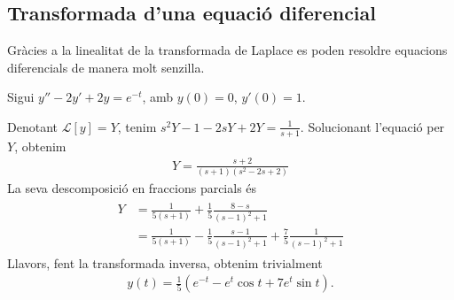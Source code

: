 \subsection{Transformada d'una equació diferencial}
Gràcies a la linealitat de la transformada de Laplace es poden resoldre equacions diferencials de manera molt senzilla.

\begin{example}
    Sigui $y'' -2y' + 2y = e^{-t}$, amb $y(0) = 0$, $y'(0) = 1$.
    
    Denotant $\mathcal{L}[y] = Y$, tenim $\displaystyle s^{2} Y - 1 - 2sY + 2Y = \frac{1}{s+1}$. Solucionant l'equació per $Y$, obtenim
    \begin{align*}
        Y = \frac{s+2}{(s+1)(s^2-2s+2)}
    \end{align*}
    La seva descomposició en fraccions parcials és
    \begin{align*}
    \begin{aligned}
        Y & = \frac{1}{5(s+1)} + \frac{1}{5}\frac{8-s}{(s-1)^{2} + 1} \\
        & = \frac{1}{5(s+1)} - \frac{1}{5}\frac{s-1}{(s-1)^{2} + 1} + \frac{7}{5}\frac{1}{(s-1)^{2} + 1}
    \end{aligned}
    \end{align*}
    Llavors, fent la transformada inversa, obtenim trivialment
    \begin{align*}
        \boxed{y(t) = \frac{1}{5} (e^{-t} - e^{t} \cos t + 7e^{t} \sin t)}.
    \end{align*}
\end{example}
